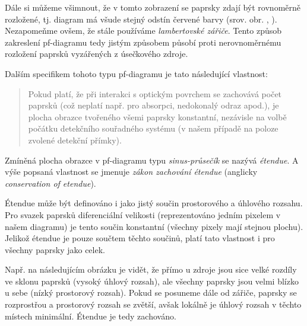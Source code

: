
Dále si můžeme všimnout, že v tomto zobrazení se paprsky zdají být rovnoměrně rozložené, tj. diagram má všude stejný odstín červené barvy (srov. obr. , ). Nezapomeňme ovšem, že stále používáme \emph{lambertovské zářiče}. Tento způsob zakreslení pf-diagramu tedy jistým způsobem působí proti nerovnoměrnému rozložení paprsků vyzářených z úsečkového zdroje.

Dalším specifikem tohoto typu pf-diagramu je tato následující vlastnost:

\begin{quote}
    Pokud platí, že při interakci s optickým povrchem se zachovává počet paprsků (což neplatí např. pro absorpci, nedokonalý odraz apod.), je plocha obrazce tvořeného všemi paprsky konstantní, nezávisle na volbě počátku detekčního souřadného systému (v našem případě na poloze zvolené detekční přímky).
\end{quote}

Zmíněná plocha obrazce v pf-diagramu typu \emph{sinus-průsečík} se nazývá \emph{étendue}. A výše popsaná vlastnost se jmenuje \emph{zákon zachování étendue} (anglicky \emph{conservation of etendue}).\parencite{chaves2017introduction,mushaveck2022designing}

Étendue může být definováno i jako jistý součin prostorového a úhlového rozsahu. Pro svazek paprsků diferenciální velikosti (reprezentováno jedním pixelem v našem diagramu) je tento součin konstantní (všechny pixely mají stejnou plochu). Jelikož étendue je pouze součtem těchto součinů, platí tato vlastnost i pro všechny paprsky jako celek.

Např. na následujícím obrázku je vidět, že přímo u zdroje jsou sice velké rozdíly ve sklonu paprsků (vysoký úhlový rozsah), ale všechny paprsky jsou velmi blízko u sebe (nízký prostorový rozsah). Pokud se posuneme dále od zářiče, paprsky se rozprostřou a prostorový rozsah se zvětší, avšak lokálně je úhlový rozsah v těchto místech minimální. Étendue je tedy zachováno.


